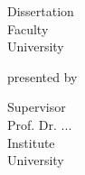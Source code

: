 \vspace*{1cm} 

{\LARGE\bfseries\@title\par}

\vspace{1cm} 
Dissertation\\Faculty\\University

\vspace{1cm} 
presented by

\vspace{0.5cm}
\textbf{\@author}

\vfill
Supervisor\\
\vspace{1em}
Prof. Dr. ...\\
\vspace{1em}
Institute\\University

